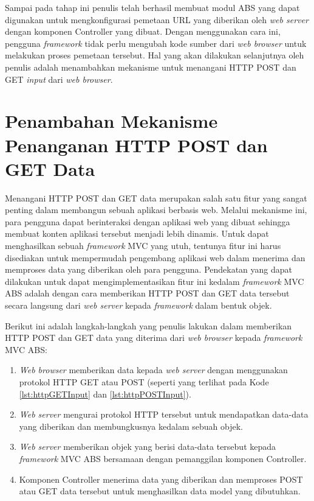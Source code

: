 Sampai pada tahap ini penulis telah berhasil membuat modul ABS yang dapat digunakan untuk mengkonfigurasi pemetaan URL yang diberikan oleh \textit{web server} dengan komponen Controller yang dibuat. Dengan menggunakan cara ini, pengguna \textit{framework} tidak perlu mengubah kode sumber dari \textit{web browser} untuk melakukan proses pemetaan tersebut. Hal yang akan dilakukan selanjutnya oleh penulis adalah menambahkan mekanisme untuk menangani HTTP POST dan GET \textit{input} dari \textit{web browser}.

\section{Penambahan Mekanisme Penanganan HTTP POST dan GET Data}

Menangani HTTP POST dan GET data merupakan salah satu fitur yang sangat penting dalam membangun sebuah aplikasi berbasis web. Melalui mekanisme ini, para pengguna dapat berinteraksi dengan aplikasi web yang dibuat sehingga membuat konten aplikasi tersebut menjadi lebih dinamis. Untuk dapat menghasilkan sebuah \textit{framework} MVC yang utuh, tentunya fitur ini harus disediakan untuk mempermudah pengembang aplikasi web dalam menerima dan memproses data yang diberikan oleh para pengguna. Pendekatan yang dapat dilakukan untuk dapat mengimplementasikan fitur ini kedalam \textit{framework} MVC ABS adalah dengan cara memberikan HTTP POST dan GET data tersebut secara langsung dari \textit{web server} kepada \textit{framework} dalam bentuk objek.

Berikut ini adalah langkah-langkah yang penulis lakukan dalam memberikan HTTP POST dan GET data yang diterima dari \textit{web browser} kepada \textit{framework} MVC ABS:

\begin{enumerate}
    \item \textit{Web browser} memberikan data kepada \textit{web server} dengan menggunakan protokol HTTP GET atau POST (seperti yang terlihat pada Kode \ref{lst:httpGETInput} dan \ref{lst:httpPOSTInput}).
    \item \textit{Web server} mengurai protokol HTTP tersebut untuk mendapatkan data-data yang diberikan dan membungkusnya kedalam sebuah objek.
    \item \textit{Web server} memberikan objek yang berisi data-data tersebut kepada \textit{framework} MVC ABS bersamaan dengan pemanggilan komponen Controller.
    \item Komponen Controller menerima data yang diberikan dan memproses POST atau GET data tersebut untuk menghasilkan data model yang dibutuhkan.
\end{enumerate}

